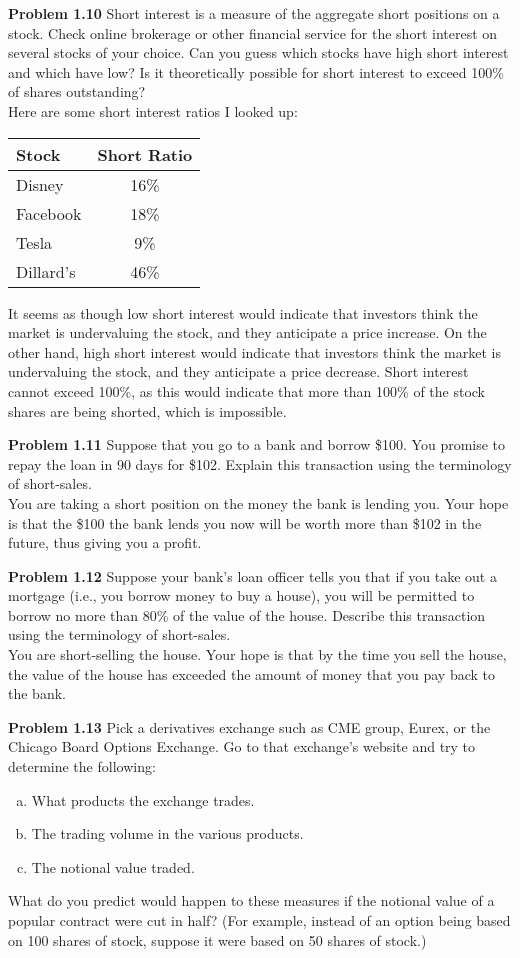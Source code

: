 \documentclass[12pt]{article}
\newcommand{\problem}[1]{\bigskip \noindent \textbf{Problem #1}}
\theoremstyle{plain}
\begin{document}
\problem{1.10} Short interest is a measure of the aggregate short positions on a stock. Check online brokerage or other financial service for the short interest on several stocks of your choice. Can you guess which stocks have high short interest and which have low? Is it theoretically possible for short interest to exceed 100\% of shares outstanding?\\

Here are some short interest ratios I looked up:
\begin{center}
\begin{tabular}{l||c}
Stock & Short Ratio \\ \hline\hline
Disney & 16\%\\
Facebook & 18\%\\
Tesla & 9\%\\
Dillard's & 46\%
\end{tabular}
\end{center}

It seems as though low short interest would indicate that investors think the market is undervaluing the stock, and they anticipate a price increase. On the other hand, high short interest would indicate that investors think the market is undervaluing the stock, and they anticipate a price decrease. Short interest cannot exceed 100\%, as this would indicate that more than 100\% of the stock shares are being shorted, which is impossible.

\problem{1.11} Suppose that you go to a bank and borrow \$100. You promise to repay the loan in 90 days for \$102. Explain this transaction using the terminology of short-sales.\\

You are taking a short position on the money the bank is lending you. Your hope is that the \$100 the bank lends you now will be worth more than \$102 in the future, thus giving you a profit.

\problem{1.12} Suppose your bank's loan officer tells you that if you take out a mortgage (i.e., you borrow money to buy a house), you will be permitted to borrow no more than 80\% of the value of the house. Describe this transaction using the terminology of short-sales.\\

You are short-selling the house. Your hope is that by the time you sell the house, the value of the house has exceeded the amount of money that you pay back to the bank.

\problem{1.13} Pick a derivatives exchange such as CME group, Eurex, or the Chicago Board Options Exchange. Go to that exchange's website and try to determine the following:
\begin{enumerate}[(a)]
\item What products the exchange trades.
\item The trading volume in the various products.
\item The notional value traded.
\end{enumerate}
What do you predict would happen to these measures if the notional value of a popular contract were cut in half? (For example, instead of an option being based on 100 shares of stock, suppose it were based on 50 shares of stock.)
\end{document}
